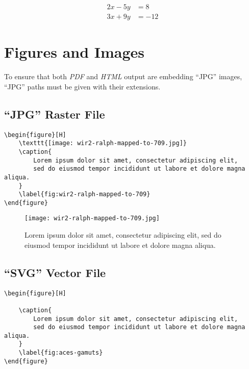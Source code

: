 \begin{align}
    2x - 5y & =  8 \\
    3x + 9y & =  -12
    \label{eq:2x5y-8}
\end{align}

\section*{Figures and Images}
\label{sec:figures-and-images}

To ensure that both \textit{PDF} and \textit{HTML} output are embedding
``JPG'' images, ``JPG'' paths must be given with their extensions.

\subsection*{``JPG'' Raster File}
\label{subsec:jpg-raster-file}

\begin{lstlisting}[caption={Embedding a ``JPG'' raster file.}]
\begin{figure}[H]
    \texttt{[image: wir2-ralph-mapped-to-709.jpg]}
    \caption{
        Lorem ipsum dolor sit amet, consectetur adipiscing elit,
        sed do eiusmod tempor incididunt ut labore et dolore magna aliqua.
    }
    \label{fig:wir2-ralph-mapped-to-709}
\end{figure}
\end{lstlisting}

\begin{figure}[H]
    \texttt{[image: wir2-ralph-mapped-to-709.jpg]}
    \caption{
        Lorem ipsum dolor sit amet, consectetur adipiscing elit,
        sed do eiusmod tempor incididunt ut labore et dolore magna aliqua.
    }
    \label{fig:wir2-ralph-mapped-to-709}
\end{figure}

\subsection*{``SVG'' Vector File}
\label{subsec:svg-vector-file}

\begin{lstlisting}[caption={Embedding a ``SVG'' vector file.}]
\begin{figure}[H]
    
    \caption{
        Lorem ipsum dolor sit amet, consectetur adipiscing elit,
        sed do eiusmod tempor incididunt ut labore et dolore magna aliqua.
    }
    \label{fig:aces-gamuts}
\end{figure}
\end{lstlisting}


